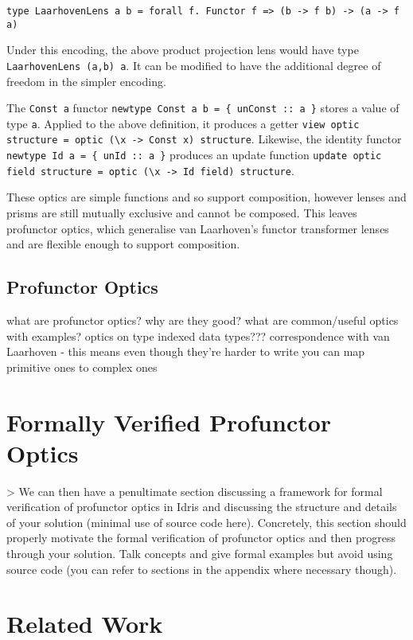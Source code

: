 \documentclass[]{report}
\begin{document}
\begin{verbatim}
type LaarhovenLens a b = forall f. Functor f => (b -> f b) -> (a -> f a)
\end{verbatim}

Under this encoding, the above product projection lens would have type \texttt{LaarhovenLens (a,b) a}. It can be modified to have the additional degree of freedom in the simpler encoding.

The \texttt{Const a} functor \texttt{newtype Const a b = \{ unConst :: a \}} stores a value of type \texttt{a}. Applied to the above definition, it produces a getter \texttt{view optic structure = optic (\textbackslash{}x -> Const x) structure}. Likewise, the identity functor \texttt{newtype Id a = \{ unId :: a \}} produces an update function \texttt{update optic field structure = optic (\textbackslash{}x -> Id field) structure}.

These optics are simple functions and so support composition, however lenses and prisms are still mutually exclusive and cannot be composed. This leaves profunctor optics, which generalise van Laarhoven's functor transformer lenses and are flexible enough to support composition.

\subsection{Profunctor Optics}

what are profunctor optics?
why are they good?
what are common/useful optics with examples?
optics on type indexed data types???
correspondence with van Laarhoven \cite{boisseau2018yoneda} - this means even though they're harder to write you can map primitive ones to complex ones

\section{Formally Verified Profunctor Optics}

> We can then have a penultimate section discussing a framework for formal verification of profunctor optics in Idris and discussing the structure and details of your solution (minimal use of source code here). Concretely, this section should properly motivate the formal verification of profunctor optics and then progress through your solution. Talk concepts and give formal examples but avoid using source code (you can refer to sections in the appendix where necessary though).


\section{Related Work}
\end{document}

